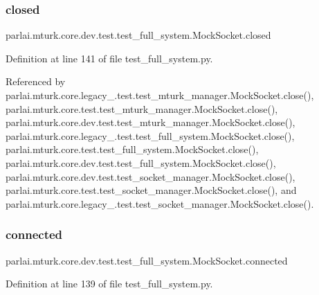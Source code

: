 \subsubsection{\texorpdfstring{closed}{closed}}
{\footnotesize\ttfamily parlai.\+mturk.\+core.\+dev.\+test.\+test\+\_\+full\+\_\+system.\+Mock\+Socket.\+closed}



Definition at line 141 of file test\+\_\+full\+\_\+system.\+py.



Referenced by parlai.\+mturk.\+core.\+legacy\+\_.\+test.\+test\+\_\+mturk\+\_\+manager.\+Mock\+Socket.\+close(), parlai.\+mturk.\+core.\+test.\+test\+\_\+mturk\+\_\+manager.\+Mock\+Socket.\+close(), parlai.\+mturk.\+core.\+dev.\+test.\+test\+\_\+mturk\+\_\+manager.\+Mock\+Socket.\+close(), parlai.\+mturk.\+core.\+legacy\+\_.\+test.\+test\+\_\+full\+\_\+system.\+Mock\+Socket.\+close(), parlai.\+mturk.\+core.\+test.\+test\+\_\+full\+\_\+system.\+Mock\+Socket.\+close(), parlai.\+mturk.\+core.\+dev.\+test.\+test\+\_\+full\+\_\+system.\+Mock\+Socket.\+close(), parlai.\+mturk.\+core.\+dev.\+test.\+test\+\_\+socket\+\_\+manager.\+Mock\+Socket.\+close(), parlai.\+mturk.\+core.\+test.\+test\+\_\+socket\+\_\+manager.\+Mock\+Socket.\+close(), and parlai.\+mturk.\+core.\+legacy\+\_.\+test.\+test\+\_\+socket\+\_\+manager.\+Mock\+Socket.\+close().

\mbox{\label{classparlai_1_1mturk_1_1core_1_1dev_1_1test_1_1test__full__system_1_1MockSocket_a0037afa3da5e2ae6d361b9302f023d2d}} 
\subsubsection{\texorpdfstring{connected}{connected}}
{\footnotesize\ttfamily parlai.\+mturk.\+core.\+dev.\+test.\+test\+\_\+full\+\_\+system.\+Mock\+Socket.\+connected}



Definition at line 139 of file test\+\_\+full\+\_\+system.\+py.

